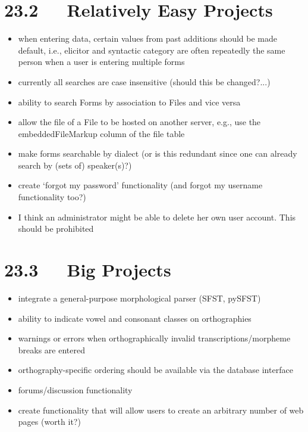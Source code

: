 \documentclass[letterpaper,10pt,english]{sphinxmanual}
\begin{document}
\section{23.2   Relatively Easy Projects}
\label{documentation:relatively-easy-projects}\begin{itemize}
\item {} 
when entering data, certain values from past additions should be made default,
i.e., elicitor and syntactic category are often repeatedly the same person
when a user is entering multiple forms

\item {} 
currently all searches are case insensitive (should this be changed?...)

\item {} 
ability to search Forms by association to Files and vice versa

\item {} 
allow the file of a File to be hosted on another server, e.g., use the
embeddedFileMarkup column of the file table

\item {} 
make forms searchable by dialect (or is this redundant since one can already
search by (sets of) speaker(s)?)

\item {} 
create `forgot my password' functionality (and forgot my username
functionality too?)

\item {} 
I think an administrator might be able to delete her own user account.  This
should be prohibited

\end{itemize}


\section{23.3   Big Projects}
\label{documentation:big-projects}\begin{itemize}
\item {} 
integrate a general-purpose morphological parser (SFST, pySFST)

\item {} 
ability to indicate vowel and consonant classes on orthographies

\item {} 
warnings or errors when orthographically invalid transcriptions/morpheme
breaks are entered

\item {} 
orthography-specific ordering should be available via the database interface

\item {} 
forums/discussion functionality

\item {} 
create functionality that will allow users to create an arbitrary number of
web pages (worth it?)

\end{itemize}
\end{document}
